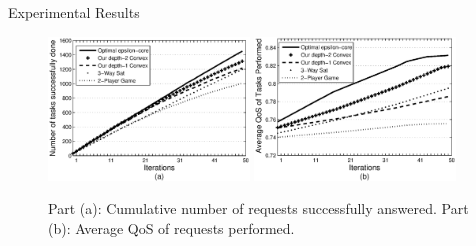 \documentclass{beamer}
\begin{document}
\begin{frame}{Experimental Results}

    \begin{figure}[!t]
    \centering
    \includegraphics[width=2.1in]{figures/task_done_opt.eps}
    \includegraphics[width=2.1in]{figures/task_qos_opt.eps}
    \caption{Part (a): Cumulative number of requests successfully
    answered. Part (b): Average QoS of requests performed.}
    \label{performanceall}
    \end{figure}

\end{frame}

\end{document}
